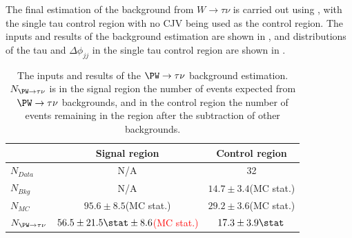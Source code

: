 The final estimation of the background from $W\rightarrow\tau\nu$ is carried out using , with the single tau control region with no \ac{CJV} being used as the control region. The inputs and results of the background estimation are shown in , and distributions of the tau \pt and $\Delta\phi_{jj}$ in the single tau control region are shown in .

\begin{table}
  \caption{The inputs and results of the $\PW\rightarrow \tau\nu$ background estimation. $N_{\PW\rightarrow \tau\nu}$ is in the signal region the number of events expected from $\PW\rightarrow \tau\nu$ backgrounds, and in the control region the number of events remaining in the region after the subtraction of other backgrounds.}
  \label{tab:promptwtaunu}
  \begin{tabular}{lcc}
    \hline
    \hline
    & Signal region & Control region \\
    \hline
    \hline
    $N_{Data}$ & N/A & 32\\
    $N_{Bkg}$ & N/A & $14.7\pm 3.4$(\ac{MC} stat.) \\
    $N_{MC}$& $95.6\pm 8.5$(\ac{MC} stat.) & $29.2\pm 3.6$(\ac{MC} stat.) \\
    \hline
    $N_{\PW\rightarrow \tau\nu}$& \textcolor{red}{$56.5\pm 21.5\stat\pm 8.6$(MC stat.)} & $17.3\pm 3.9 \stat$ \\
    \hline
    \hline
  \end{tabular}
\end{table}

